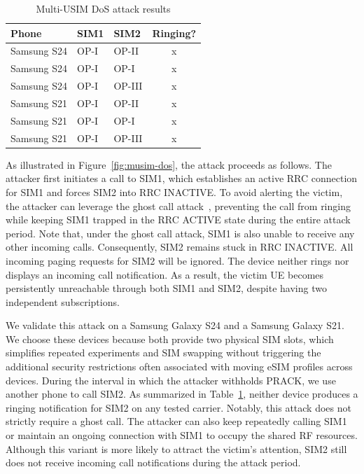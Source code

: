 \documentclass[sigconf]{acmart}
\begin{document}
{\vspace{-0.1in}
\begin{table}[H]
\centering
\caption{Multi-USIM DoS attack results}
\vspace{-0.1in}
\label{tab:dual_sim_ringing_data}
\small
\begin{tabular}{l l l c}
\hline
\textbf{Phone} & \textbf{SIM1} & \textbf{SIM2} & \textbf{Ringing?} \\
\hline
Samsung S24 & OP-I & OP-II  & x \\
Samsung S24 & OP-I & OP-I   & x \\
Samsung S24 & OP-I & OP-III & x \\
Samsung S21 & OP-I & OP-II  & x \\
Samsung S21 & OP-I & OP-I   & x \\
Samsung S21 & OP-I & OP-III & x \\
\hline
\end{tabular}
\end{table}

As illustrated in Figure~\ref{fig:musim-dos}, the attack proceeds as follows.
The attacker first initiates a call to SIM1, which establishes an active RRC connection for SIM1 and forces SIM2 into RRC INACTIVE. To avoid alerting the victim, the attacker can leverage the ghost call attack~\cite{lu2020ghost,wang2021insecurity}, preventing the call from ringing while keeping SIM1 trapped in the RRC ACTIVE state during the entire attack period. 
Note that, under the ghost call attack, SIM1 is also unable to receive any other incoming calls. Consequently, SIM2 remains stuck in RRC INACTIVE. All incoming paging requests for SIM2 will be ignored. The device neither rings nor displays an incoming call notification. As a result, the victim UE becomes persistently unreachable through both SIM1 and SIM2, despite having two independent subscriptions.   


We validate this attack on a Samsung Galaxy S24 and a Samsung Galaxy S21. We choose these devices because both provide two physical SIM slots, which simplifies repeated experiments and SIM swapping without triggering the additional security restrictions often associated with moving eSIM profiles across devices. During the interval in which the attacker withholds \textsf{PRACK}, we use another phone to call SIM2. As summarized in Table~\ref{tab:dual_sim_ringing_data}, neither device produces a ringing notification for SIM2 on any tested carrier. Notably, this attack does not strictly require a ghost call. The attacker can also keep repeatedly calling SIM1 or maintain an ongoing connection with SIM1 to occupy the shared RF resources. Although this variant is more likely to attract the victim’s attention, SIM2 still does not receive incoming call notifications during the attack period.



}
\end{document}
